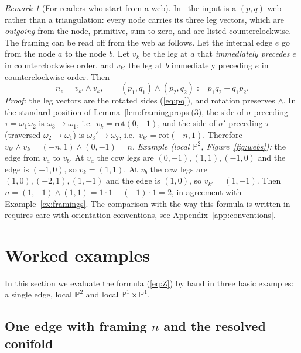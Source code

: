 \documentclass[11pt]{article}
\theoremstyle{plain}
\theoremstyle{definition}
\theoremstyle{remark}
\newtheorem{remark}[theorem]{Remark}
\newcommand{\PP}{\mathbb{P}}
\begin{document}
\begin{remark}[For readers who start from a web]\label{rem:web}
In~\cite{AKMV} the input is a $(p,q)$-web rather than a triangulation: every node carries its
three leg vectors, which are \textit{outgoing} from the node, primitive, sum to zero, and are listed
counterclockwise. The framing can be read off from the web as follows. Let the internal edge $e$
go from the node $a$ to the node $b$. Let $v_k$ be the leg at $a$ that \textit{immediately
precedes} $e$ in counterclockwise order, and $v_{k'}$ the leg at $b$ immediately preceding $e$
in counterclockwise order. Then
\begin{equation}\label{eq:webframing}
n_e=v_{k'}\wedge v_k,\qquad (p_1,q_1)\wedge(p_2,q_2):=p_1q_2-q_1p_2 .
\end{equation}
\textit{Proof:} the leg vectors are the rotated sides (\ref{eq:pq}), and rotation preserves
$\wedge$. In the standard position of Lemma~\ref{lem:framingprops}(3), the side of $\sigma$
preceding $\tau=\omega_1\omega_2$ is $\omega_3\rightarrow\omega_1$, i.e.\ $v_k=\mathrm{rot}(0,-1)$, and the
side of $\sigma'$ preceding $\tau$ (traversed $\omega_2\rightarrow\omega_1$) is $\omega_3'\rightarrow\omega_2$, i.e.\
$v_{k'}=\mathrm{rot}(-n,1)$. Therefore $v_{k'}\wedge v_k=(-n,1)\wedge(0,-1)=n$.
\textit{Example (local $\PP^2$, Figure~\ref{fig:webs}):} the edge from $v_a$ to $v_b$. At $v_a$ the
ccw legs are $(0,-1),(1,1),(-1,0)$ and the edge is $(-1,0)$, so $v_k=(1,1)$. At $v_b$ the ccw legs
are $(1,0),(-2,1),(1,-1)$ and the edge is $(1,0)$, so $v_{k'}=(1,-1)$. Then
$n=(1,-1)\wedge(1,1)=1\cdot1-(-1)\cdot1=2$, in agreement with Example~\ref{ex:framings}. The
comparison with the way this formula is written in~\cite{AKMV} requires care with orientation
conventions, see Appendix~\ref{app:conventions}.
\end{remark}

\section{Worked examples}\label{sec:examples}

In this section we evaluate the formula (\ref{eq:Z}) by hand in three basic examples: a single
edge, local $\PP^2$ and local $\PP^1\times\PP^1$.

\subsection{One edge with framing \texorpdfstring{$n$}{n} and the resolved conifold}\label{ssec:oneedge}
\end{document}

